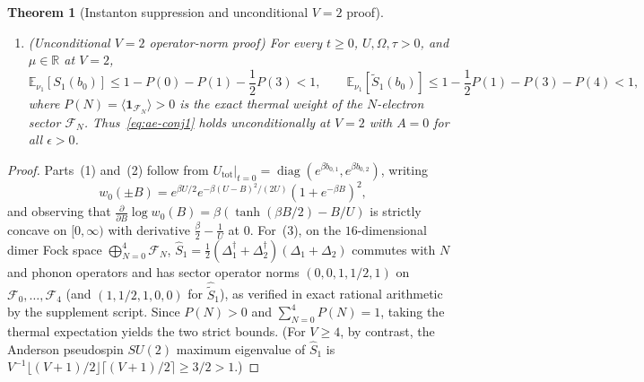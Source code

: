 \documentclass[11pt]{article}
\newtheorem{theorem}{Theorem}[section]
\theoremstyle{definition}
\theoremstyle{remark}
\DeclareMathOperator{\diag}{diag}
\newcommand{\E}{\mathbb{E}}
\newcommand{\R}{\mathbb{R}}
\begin{document}
\begin{theorem}[Instanton suppression and unconditional $V=2$ proof]
\begin{enumerate}[leftmargin=1.5em]
\begin{equation}
\end{equation}
where $C_{\mathrm{bar}}(\beta U) := 16(1 + e^{-\beta U})^{-4} \in (1, 16)$.
Its exact supremum over $B \in [0, U]$ (and $[0,\infty)$) is attained at
$B_*(\beta U) = 0$ when $\beta U \le 2$ (value $16 e^{-\beta U}(1 + e^{-\beta U})^{-4}$)
and at the unique positive root $B_*(\beta U) \in (0, U)$ of
$\tanh(\beta B_*/2) = B_*/U$ when $\beta U > 2$. In particular, for separated
barriers $U - B \ge \sqrt{U\tau\log(16/\delta)}$, $R_0 \le \delta \ll 1$
(at the instanton point $U=3.0, B=1.0, \tau=0.1$, $R_0 \approx 1.620\times 10^{-6}$),
while in the unseparated regime $\beta U = 1, B = 0.9U$ one can have $R_0 \approx 1.1069 > 1$.
\item \emph{(Unconditional $V=2$ operator-norm proof)} For every $t \ge 0$,
$U, \Omega, \tau > 0$, and $\mu \in \R$ at $V = 2$,
\[
\E_{\nu_1}[S_1(b_0)] \le 1 - P(0) - P(1) - \frac{1}{2}P(3) < 1,
\qquad
\E_{\nu_1}[\tilde{S}_1(b_0)] \le 1 - \frac{1}{2}P(1) - P(3) - P(4) < 1,
\]
where $P(N) = \langle \mathbf{1}_{\mathcal{F}_N}\rangle > 0$ is the exact thermal
weight of the $N$-electron sector $\mathcal{F}_N$. Thus~\eqref{eq:ae-conj1} holds
unconditionally at $V=2$ with $A = 0$ for all $\epsilon > 0$.
\end{enumerate}
\end{theorem}

\begin{proof}
Parts~(1) and~(2) follow from $U_{\mathrm{tot}}|_{t=0} = \diag(e^{\beta b_{0,1}}, e^{\beta b_{0,2}})$,
writing
\[
w_0(\pm B) = e^{\beta U/2} e^{-\beta(U-B)^2/(2U)}(1 + e^{-\beta B})^2,
\]
and observing that $\frac{\partial}{\partial B}\log w_0(B) = \beta(\tanh(\beta B/2) - B/U)$
is strictly concave on $[0, \infty)$ with derivative $\frac{\beta}{2} - \frac{1}{U}$ at $0$.
For~(3), on the $16$-dimensional dimer Fock space $\bigoplus_{N=0}^4 \mathcal{F}_N$,
$\hat{S}_1 = \frac{1}{2}(\Delta_1^\dagger + \Delta_2^\dagger)(\Delta_1 + \Delta_2)$
commutes with $N$ and phonon operators and has sector operator norms
$(0, 0, 1, 1/2, 1)$ on $\mathcal{F}_0,\dots,\mathcal{F}_4$ (and $(1, 1/2, 1, 0, 0)$
for $\hat{\tilde{S}}_1$), as verified in exact rational arithmetic by the
supplement script. Since $P(N) > 0$ and $\sum_{N=0}^4 P(N) = 1$,
taking the thermal expectation yields the two strict bounds. (For $V \ge 4$,
by contrast, the Anderson pseudospin $SU(2)$ maximum eigenvalue of $\hat{S}_1$
is $V^{-1}\lfloor (V+1)/2\rfloor \lceil (V+1)/2\rceil \ge 3/2 > 1$.)
\end{proof}
\end{document}
